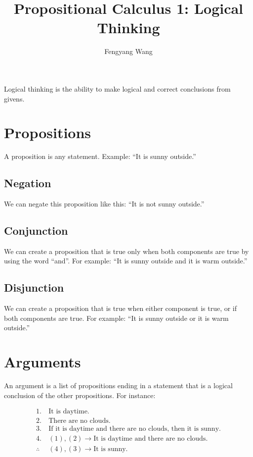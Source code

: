 \documentclass[letterpaper,10pt]{article}
\title{Propositional Calculus 1: Logical Thinking}
\author{Fengyang Wang}
\begin{document}
\maketitle

Logical thinking is the ability to make logical and correct conclusions
from givens.

\section{Propositions}

A proposition is any statement. Example: ``It is sunny outside.''

\subsection{Negation}

We can negate this proposition like this: ``It is not sunny outside.''

\subsection{Conjunction}

We can create a proposition that is true only when both components
are true by using the word ``and''. For example: ``It is sunny outside
and it is warm outside.''

\subsection{Disjunction}

We can create a proposition that is true when either component is
true, or if both components are true. For example: ``It is sunny outside
or it is warm outside.''

\section{Arguments}

An argument is a list of propositions ending in a statement that is
a logical conclusion of the other propositions. For instance:

\begin{align*}
 1.~&\text{It is daytime.} \\
 2.~&\text{There are no clouds.} \\
 3.~&\text{If it is daytime and there are no clouds, then it is sunny.} \\
 \hline
 4.~&(1), (2) \to \text{It is daytime and there are no clouds.} \\
 \hline
 \therefore~&(4), (3) \to \text{It is sunny.}
\end{align*}
\end{document}
